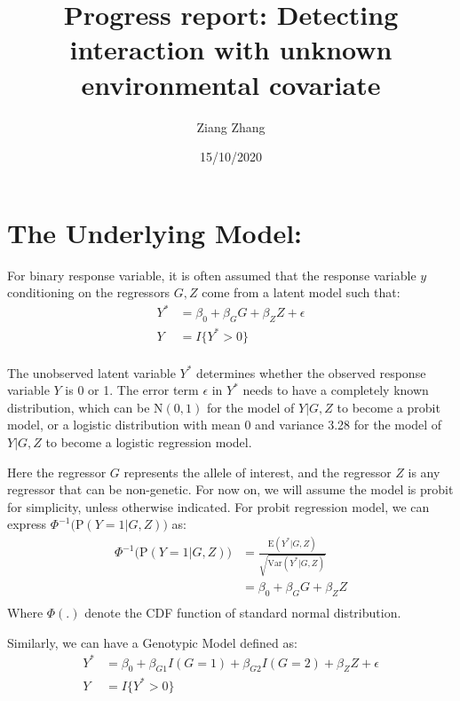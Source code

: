 \documentclass[
]{article}
\title{Progress report: Detecting interaction with unknown environmental
covariate}
\author{Ziang Zhang}
\date{15/10/2020}
\begin{document}
\maketitle

\hypertarget{the-underlying-model}{%
\section{The Underlying Model:}\label{the-underlying-model}}

For binary response variable, it is often assumed that the response
variable \(y\) conditioning on the regressors \(G,Z\) come from a latent
model such that: \begin{equation}\label{eqn:latentformulation}
\begin{aligned}
Y^* &= \beta_0 + \beta_G G + \beta_Z Z + \epsilon \\
Y &= I\{Y^*>0\} \\
\end{aligned}
\end{equation}

The unobserved latent variable \(Y^*\) determines whether the observed
response variable \(Y\) is 0 or 1. The error term \(\epsilon\) in
\(Y^*\) needs to have a completely known distribution, which can be
\(\text{N}(0,1)\) for the model of \(Y|G,Z\) to become a probit model,
or a logistic distribution with mean 0 and variance 3.28 for the model
of \(Y|G,Z\) to become a logistic regression model.

Here the regressor \(G\) represents the allele of interest, and the
regressor \(Z\) is any regressor that can be non-genetic. For now on, we
will assume the model is probit for simplicity, unless otherwise
indicated. For probit regression model, we can express
\(\Phi^{-1}\bigg(\text{P}(Y=1|G,Z)\bigg)\) as:
\begin{equation}\label{eqn:probitModelLinearity}
\begin{aligned}
\Phi^{-1}\bigg(\text{P}(Y=1|G,Z)\bigg) &= \frac{\text{E}(Y^* |G,Z)}{\sqrt{\text{Var}(Y^* |G,Z)}} \\
                                       &= \beta_0 + \beta_G G + \beta_Z Z \\
\end{aligned}
\end{equation} Where \(\Phi(.)\) denote the CDF function of standard
normal distribution.

Similarly, we can have a Genotypic Model defined as:\\
\begin{equation}\label{eqn:latentformulationGeno}
\begin{aligned}
Y^* &= \beta_0 + \beta_{G1} I(G = 1) + \beta_{G2} I(G = 2) + \beta_Z Z + \epsilon \\
Y &= I\{Y^*>0\} \\
\end{aligned}
\end{equation}
\end{document}
